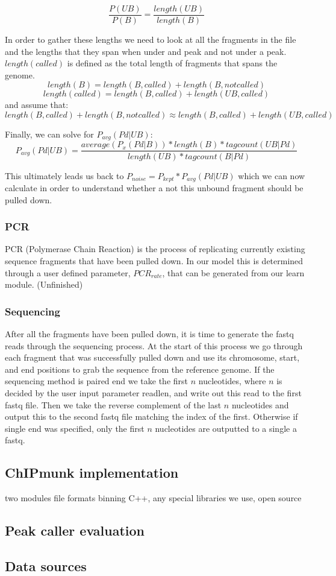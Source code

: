 \documentclass[12pt]{article}
\begin{document}
$$\dfrac{P(UB)}{P(B)} = \dfrac{length(UB)}{length(B)}$$

In order to gather these lengths we need to look at all the fragments in the file and the lengths that they span when under and peak and not under a peak. $length(called)$ is defined as the total length of fragments that spans the genome. 
$$length(B) = length(B, called) + length(B, not called)$$
$$length(called) = length(B, called) + length(UB, called)$$
and assume that:
$$length(B, called) + length(B, not called) \approx length(B, called) + length(UB, called)$$

Finally, we can solve for $P_{avg}(Pd|UB)$:
$$P_{avg}(Pd|UB) = \dfrac{average(P_x(Pd|B))*length(B)*tagcount(UB|Pd)}{length(UB)*tagcount(B|Pd)}$$

This ultimately leads us back to $P_{noise} = P_{kept}*P_{avg}(Pd|UB)$ which we can now calculate in order to understand whether a not this unbound fragment should be pulled down.

\subsubsection*{PCR}

PCR (Polymerase Chain Reaction) is the process of replicating currently existing sequence fragments that have been pulled down. In our model this is determined through a user defined parameter, $PCR_{rate}$, that can be generated from our learn module. (Unfinished)

\subsubsection*{Sequencing}

After all the fragments have been pulled down, it is time to generate the fastq reads through the sequencing process. At the start of this process we go through each fragment that was successfully pulled down and use its chromosome, start, and end positions to grab the sequence from the reference genome. If the sequencing method is paired end we take the first $n$ nucleotides, where $n$ is decided by the user input parameter readlen, and write out this read to the first fastq file. Then we take the reverse complement of the last $n$ nucleotides and output this to the second fastq file matching the index of the first. Otherwise if single end was specified, only the first $n$ nucleotides are outputted to a single a fastq.


\subsection*{ChIPmunk implementation}

two modules
file formats
binning
C++, any special libraries we use, open source

\subsection*{Peak caller evaluation}



\subsection*{Data sources}
\end{document}
